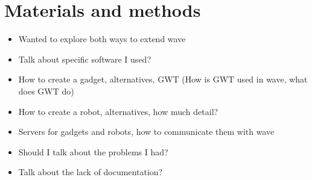 \newpage
\section{Materials and methods}

\begin{itemize}
  \item Wanted to explore both ways to extend wave
  \item Talk about specific software I used?
  \item How to create a gadget, alternatives, GWT (How is GWT used in wave, what does GWT do)
  \item How to create a robot, alternatives, how much detail?
  \item Servers for gadgets and robots, how to communicate them with wave
  \item Should I talk about the problems I had?
  \item Talk about the lack of documentation?
\end{itemize}
